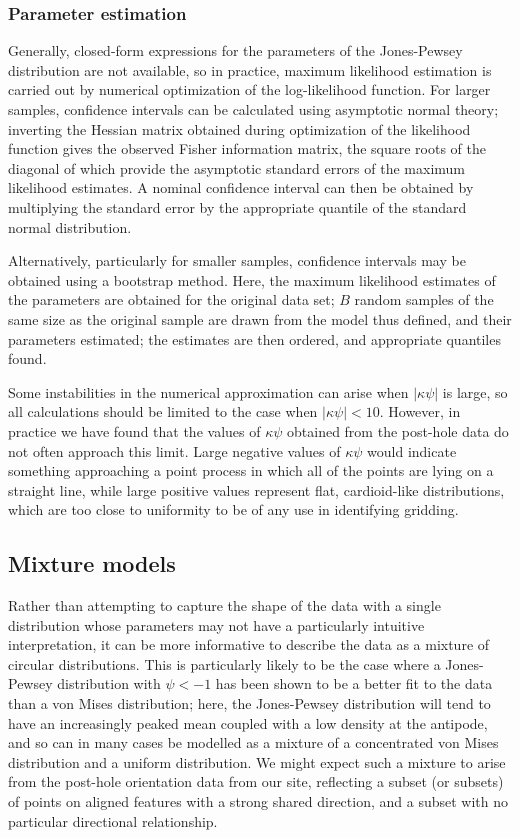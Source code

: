 \documentclass[../../ArchStats.tex]{subfiles}
\begin{document}
\subsubsection{Parameter estimation}
\label{sec:JP-params}

Generally, closed-form expressions for the parameters of the Jones-Pewsey distribution are not available, so in practice, maximum likelihood estimation is carried out by numerical optimization of the log-likelihood function. For larger samples, confidence intervals can be calculated using asymptotic normal theory; inverting the Hessian matrix obtained during optimization of the likelihood function gives the observed Fisher information matrix, the square roots of the diagonal of which provide the asymptotic standard errors of the maximum likelihood estimates. A nominal confidence interval can then be obtained by multiplying the standard error by the appropriate quantile of the standard normal distribution.

Alternatively, particularly for smaller samples, confidence intervals may be obtained using a bootstrap method. Here, the maximum likelihood estimates of the parameters are obtained for the original data set; $B$ random samples of the same size as the original sample are drawn from the model thus defined, and their parameters estimated; the estimates are then ordered, and appropriate quantiles found.

Some instabilities in the numerical approximation can arise when $\vert \kappa \psi \vert$ is large, so all calculations should be limited to the case when $\vert \kappa \psi \vert < 10$. However, in practice we have found that the values of $\kappa \psi$ obtained from the post-hole data do not often approach this limit. Large negative values of $\kappa \psi$ would indicate something approaching a point process in which all of the points are lying on a straight line, while large positive values represent flat, cardioid-like distributions, which are too close to uniformity to be of any use in identifying gridding.

\subsection{Mixture models}
\label{sec:mixture-models}
Rather than attempting to capture the shape of the data with a single distribution whose parameters may not have a particularly intuitive interpretation, it can be more informative to describe the data as a mixture of circular distributions.  This is particularly likely to be the case where a Jones-Pewsey distribution with  $\psi < -1$ has been shown to be a better fit to the data than a von Mises distribution; here, the Jones-Pewsey distribution will tend to have an increasingly peaked mean coupled with a low density at the antipode, and so can in many cases be modelled as a mixture of a concentrated von Mises distribution and a uniform distribution. We might expect such a mixture to arise from the post-hole orientation data from our site, reflecting a subset (or subsets) of points on aligned features with a strong shared direction, and a subset with no particular directional relationship.
\end{document}
